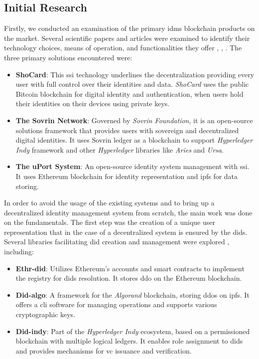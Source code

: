 \subsection{Initial Research}

Firstly, we conducted an examination of the primary \gls{idms} blockchain products on the market. Several scientific papers and articles were examined to identify their technology
choices, means of operation, and functionalities they offer \cite{9315899}, \cite{9129332}, \cite{8776589}. The three primary solutions encountered were:

\begin{itemize}
  \item \textbf{ShoCard}: This \gls{ssi} technology underlines the decentralization providing every user with full control over their identities and data. \textit{ShoCard} uses the public 
  Bitcoin blockchain for digital identity and authentication, when users hold their identities on their devices using private keys.
  \item \textbf{The Sovrin Network}: Governed by \textit{Sovrin Foundation}, it is an open-source solutions framework that provides users with sovereign and decentralized digital 
  identities. It uses Sovrin ledger as a blockchain to support \textit{Hyperledger Indy} framework and other \textit{Hyperledger} libraries like \textit{Aries} and \textit{Ursa}.
  \item \textbf{The uPort System}: An open-source identity system management with \gls{ssi}. It uses Ethereum blockchain for identity representation and 
  \gls{ipfs} for data storing.
\end{itemize}

In order to avoid the usage of the existing systems and to bring up a decentralized identity management system from scratch, the main work was done on the fundamentals. The 
first step was the creation of a unique user representation that in the case of a decentralized system is ensured by the \gls{did}s. Several libraries facilitating \gls{did} creation 
and management were explored \cite{10218198}, including:

\begin{itemize}
  \item \textbf{Ethr-did}: Utilizes Ethereum's accounts and smart contracts to implement the registry for \gls{did}s resolution. It stores \gls{ddo} on the Ethereum blockchain.
  \item \textbf{Did-algo}: A framework for the \textit{Algorand} blockchain, storing \gls{ddo}s on \gls{ipfs}. It offers a \gls{cli} software for managing operations and supports various 
  cryptographic keys.
  \item \textbf{Did-indy}: Part of the \textit{Hyperledger Indy} ecosystem, based on a permissioned blockchain with multiple logical ledgers. It enables role assignment to \gls{did}s and 
  provides mechanisms for \gls{vc} issuance and verification.
\end{itemize}

